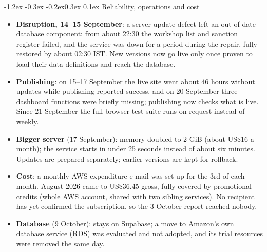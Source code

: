 \documentclass[10pt,a4paper]{article}
\makeatletter
\renewcommand\section{\@startsection{section}{1}{\z@}%
  {-1.2ex \@plus -0.3ex \@minus -0.2ex}{0.3ex \@plus 0.1ex}%
  {\normalfont\large\bfseries\color{accent}}}
\makeatother
\begin{document}
\section{Reliability, operations and cost}
\begin{itemize}
\item \textbf{Disruption, 14--15 September}: a server-update defect left an out-of-date database component:
  from about 22:30 the workshop list and sanction register failed, and the service was down for a period
  during the repair, fully restored by about 02:30 IST. New versions now go live only once proven to load
  their data definitions and reach the database.
\item \textbf{Publishing}: on 15--17 September the live site went about 46 hours without updates while publishing
  reported success, and on 20 September three dashboard functions were briefly missing; publishing now
  checks what is live. Since 21 September the full browser test suite runs on request instead of weekly.
\item \textbf{Bigger server} (17 September): memory doubled to 2 GiB (about US\$16 a month); the service starts in
  under 25 seconds instead of about six minutes. Updates are prepared separately; earlier versions are
  kept for rollback.
\item \textbf{Cost}: a monthly AWS expenditure e-mail was set up for the 3rd of each month. August 2026 came to
  US\$36.45 gross, fully covered by promotional credits (whole AWS account, shared with two sibling
  services). No recipient has yet confirmed the subscription, so the 3 October report reached nobody.
\item \textbf{Database} (9 October): stays on Supabase; a move to Amazon's own database service (RDS) was
  evaluated and not adopted, and its trial resources were removed the same day.
\end{itemize}
\end{document}
